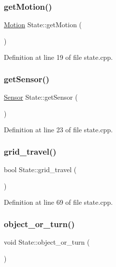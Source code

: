\subsubsection{\texorpdfstring{get\+Motion()}{getMotion()}}
{\footnotesize\ttfamily \mbox{\hyperlink{class_motion}{Motion}} State\+::get\+Motion (\begin{DoxyParamCaption}{ }\end{DoxyParamCaption})}



Definition at line 19 of file state.\+cpp.

\mbox{\label{class_state_a9195abef447816fe4830f875f0b1dda2}} 
\subsubsection{\texorpdfstring{get\+Sensor()}{getSensor()}}
{\footnotesize\ttfamily \mbox{\hyperlink{class_sensor}{Sensor}} State\+::get\+Sensor (\begin{DoxyParamCaption}{ }\end{DoxyParamCaption})}



Definition at line 23 of file state.\+cpp.

\mbox{\label{class_state_a4e9d67c11218113bfa282ddccfd6326a}} 
\subsubsection{\texorpdfstring{grid\+\_\+travel()}{grid\_travel()}}
{\footnotesize\ttfamily bool State\+::grid\+\_\+travel (\begin{DoxyParamCaption}{ }\end{DoxyParamCaption})}



Definition at line 69 of file state.\+cpp.

\mbox{\label{class_state_ae03eae00675106f8b6b9481c4b0e50dc}} 
\subsubsection{\texorpdfstring{object\+\_\+or\+\_\+turn()}{object\_or\_turn()}}
{\footnotesize\ttfamily void State\+::object\+\_\+or\+\_\+turn (\begin{DoxyParamCaption}{ }\end{DoxyParamCaption})}



